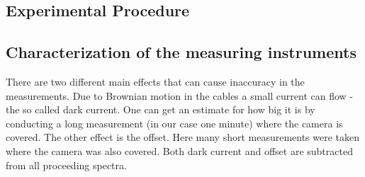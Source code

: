 \documentclass[12pt, a4paper, bibliography=totoc]{scrartcl}
\begin{document}
\begin{multicols}{2}
\section{Experimental Procedure}
\subsection{Characterization of the measuring instruments}
 
    There are two different main effects that can cause inaccuracy in the measurements.
Due to Brownian motion in the cables a small current can flow - the so called dark current.
    One can get an estimate for how big it is by conducting a long measurement (in our case one minute) where the camera is covered.
The other effect is the offset.
Here many short measurements were taken where the camera was also covered.
Both dark current and offset are subtracted from all proceeding spectra.



\end{multicols}
\end{document}
